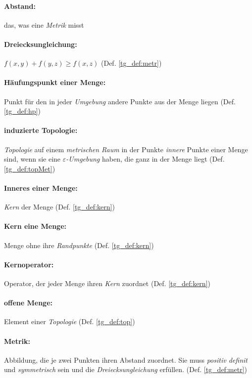     \paragraph{Abstand:} das, was eine \textit{Metrik} misst
    
    \paragraph{Dreiecksungleichung:} $f(x,y) + f(y,z) \geq f(x,z)$ (Def. \ref{tg_def:metr})

    \paragraph{Häufungspunkt einer Menge:} Punkt für den in jeder \textit{Umgebung} andere Punkte aus der Menge liegen (Def. \ref{tg_def:hp})
    
    \paragraph{induzierte Topologie:} \textit{Topologie} auf einem \textit{metrischen Raum} in der Punkte \textit{innere} Punkte einer Menge sind, wenn sie eine \textit{$\varepsilon$-Umgebung} haben, die ganz in der Menge liegt (Def. \ref{tg_def:topMet})

    \paragraph{Inneres einer Menge:} \textit{Kern} der Menge (Def. \ref{tg_def:kern})

    \paragraph{Kern eine Menge:} Menge ohne ihre \textit{Randpunkte} (Def. \ref{tg_def:kern})

    \paragraph{Kernoperator:} Operator, der jeder Menge ihren \textit{Kern} zuordnet (Def. \ref{tg_def:kern})

    \paragraph{offene Menge:} Element einer \textit{Topologie} (Def. \ref{tg_def:top})
    
    \paragraph{Metrik:} Abbildung, die je zwei Punkten ihren Abstand zuordnet. Sie muss \textit{positiv definit} und \textit{symmetrisch} sein und die \textit{Dreiecksungleichung} erfüllen. (Def. \ref{tg_def:metr})
    
